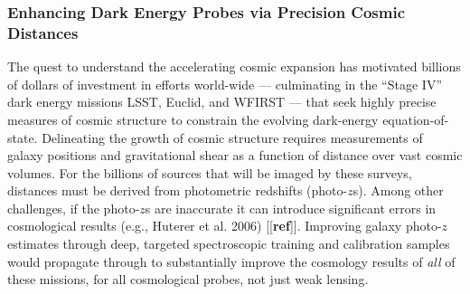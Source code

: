 \documentclass[oneside,11pt]{amsart}
\newcommand{\comment}[2][todo]{{\color{#1}[[{\bf #2}]]}}
\begin{document}

\subsubsection{Enhancing Dark Energy Probes via Precision Cosmic Distances}
\label{sec:cosmology}

The quest to understand the accelerating cosmic expansion has
motivated billions of dollars of investment in efforts world-wide ---
culminating in the ``Stage IV'' dark energy missions LSST, Euclid,
and WFIRST --- that seek highly precise measures of cosmic structure
to constrain the evolving dark-energy equation-of-state. Delineating
the growth of cosmic structure requires measurements of galaxy
positions and gravitational shear as a function of distance over vast
cosmic volumes. For the billions of sources that will be imaged by
these surveys, distances must be derived from photometric redshifts
(photo-$z$s). Among other challenges, if the photo-$z$s are
inaccurate it can introduce significant errors in cosmological
results (e.g., Huterer et al. 2006) \comment{ref}. Improving galaxy
photo-$z$ estimates through deep, targeted spectroscopic training and
calibration samples would propagate through to substantially improve
the cosmology results of \emph{all} of these missions, for all
cosmological probes, not just weak lensing.
\end{document}
